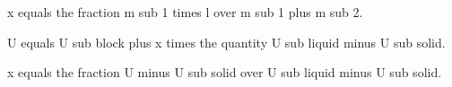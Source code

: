 x equals the fraction m sub 1 times l over m sub 1 plus m sub 2.

U equals U sub block plus x times the quantity U sub liquid minus U sub solid.

x equals the fraction U minus U sub solid over U sub liquid minus U sub solid.